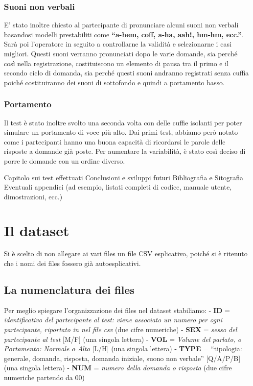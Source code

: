 \documentclass[
]{article}
\begin{document}
\subsubsection{Suoni non verbali}\label{suoni-non-verbali}

E' stato inoltre chiesto al partecipante di pronunciare alcuni suoni non verbali basandosi modelli prestabiliti come \textbf{``a-hem, coff, a-ha, aah!, hm-hm, ecc.''}. Sarà poi l'operatore in seguito a controllarne la validità e selezionarne i casi migliori. Questi suoni verranno pronunciati dopo le varie domande, sia perché così nella registrazione, costituiscono un elemento di pausa tra il primo e il secondo ciclo di domanda, sia perché questi suoni andranno registrati senza cuffia poiché costituiranno dei suoni di sottofondo e quindi a portamento basso.

\subsubsection{Portamento}\label{portamento}

Il test è stato inoltre svolto una seconda volta con delle cuffie isolanti per poter simulare un portamento di voce più alto. Dai primi test, abbiamo però notato come i partecipanti hanno una buona capacità di ricordarsi le parole delle risposte a domande già poste. Per aumentare la variabilità, è stato così deciso di porre le domande con un ordine diverso.

Capitolo sui test effettuati Conclusioni e sviluppi futuri Bibliografia e Sitografia Eventuali appendici (ad esempio, listati completi di codice, manuale utente, dimostrazioni, ecc.)

\section{Il dataset}\label{il-dataset}

Si è scelto di non allegare ai vari files un file CSV esplicativo, poiché si è ritenuto che i nomi dei files fossero già autoesplicativi.

\subsection{La numenclatura dei files}\label{la-numenclatura-dei-files}

Per meglio spiegare l'organizzazione dei files nel dataset stabiliamo: - \textbf{ID} = \emph{identificativo del partecipante al test: viene associato un numero per ogni partecipante, riportato in nel file csv} (due cifre numeriche) - \textbf{SEX} = \emph{sesso del partecipante al test} {[}M/F{]} (una singola lettera) - \textbf{VOL} = \emph{Volume del parlato, o Portamento: Normale o Alto} {[}L/H{]} (una singola lettera) - \textbf{TYPE} = ``tipologia: generale, domanda, risposta, domanda iniziale, suono non verbale'' {[}Q/A/P/B{]} (una singola lettera) - \textbf{NUM} = \emph{numero della domanda o risposta} (due cifre numeriche partendo da 00)
\end{document}
